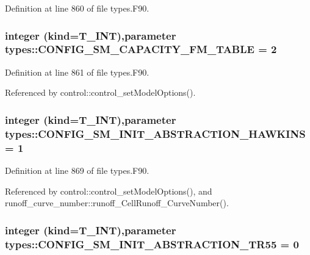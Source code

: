 Definition at line 860 of file types.F90.

\hypertarget{namespacetypes_a1e791678151ab504a924265e5f999d4e}{
\subsubsection[{CONFIG\_\-SM\_\-CAPACITY\_\-FM\_\-TABLE}]{\setlength{\rightskip}{0pt plus 5cm}integer (kind={\bf T\_\-INT}),parameter {\bf types::CONFIG\_\-SM\_\-CAPACITY\_\-FM\_\-TABLE} = 2}}
\label{namespacetypes_a1e791678151ab504a924265e5f999d4e}


Definition at line 861 of file types.F90.



Referenced by control::control\_\-setModelOptions().

\hypertarget{namespacetypes_a580e1bc2da4e4c9c9881e31d2ee11478}{
\subsubsection[{CONFIG\_\-SM\_\-INIT\_\-ABSTRACTION\_\-HAWKINS}]{\setlength{\rightskip}{0pt plus 5cm}integer (kind={\bf T\_\-INT}),parameter {\bf types::CONFIG\_\-SM\_\-INIT\_\-ABSTRACTION\_\-HAWKINS} = 1}}
\label{namespacetypes_a580e1bc2da4e4c9c9881e31d2ee11478}


Definition at line 869 of file types.F90.



Referenced by control::control\_\-setModelOptions(), and runoff\_\-curve\_\-number::runoff\_\-CellRunoff\_\-CurveNumber().

\hypertarget{namespacetypes_a479612698829962978355c82816e1875}{
\subsubsection[{CONFIG\_\-SM\_\-INIT\_\-ABSTRACTION\_\-TR55}]{\setlength{\rightskip}{0pt plus 5cm}integer (kind={\bf T\_\-INT}),parameter {\bf types::CONFIG\_\-SM\_\-INIT\_\-ABSTRACTION\_\-TR55} = 0}}
\label{namespacetypes_a479612698829962978355c82816e1875}


